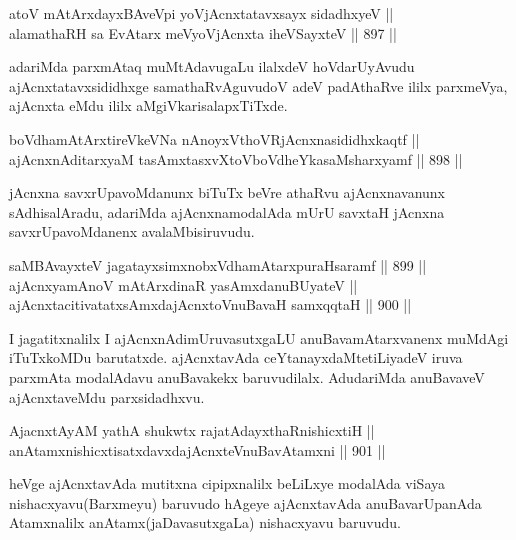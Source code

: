 \begin{shl}
atoV mAtArxdayxBAveV\s pi yoV\s jAcnxtatavxsayx sidadhxyeV || \\
alamathaRH sa EvAtarx meVyoV\s jAcnxta iheVSayxteV \hfill || 897 ||  
\end{shl}

\begin{artha}
adariMda parxmAtaq muMtAdavugaLu ilalxdeV hoVdarU\break yAvudu ajAcnxtatavxsididhxge samathaRvAguvudoV adeV padAthaRve ililx parxmeVya, ajAcnxta eMdu ililx aMgiVkarisalapxTiTxde.
\end{artha}


\begin{shl}
boVdhamAtArxtireVkeVNa nAnoyxV\s thoVR\s jAcnxnasididhxkaqtf || \\
ajAcnxnAditarxyaM tasAmxtasxvXtoVboVdheYkasaMsharxyamf \hfill || 898 ||  
\end{shl}

\begin{artha}
jAcnxna savxrUpavoMdanunx biTuTx beVre athaRvu ajAcnxnavanunx sAdhisalAradu, adariMda ajAcnxnamodalAda mUrU savxtaH jAcnxna savxrUpavoMdanenx avalaMbisiruvudu.
\end{artha}

\begin{shl}
saMBAvayxteV jagatayxsimxnobxVdhamAtarxpuraHsaramf \hfill || 899 || \\
ajAcnxyamAnoV mAtArxdinaR yasAmxdanuBUyateV || \\
ajAcnxtacitivatatxsAmxdajAcnxtoV\s nuBavaH samxqqtaH \hfill || 900 || 
\end{shl}

\begin{artha}
I jagatitxnalilx I ajAcnxnAdimUruvasutxgaLU anuBavamAtarxvanenx muMdAgi iTuTxkoMDu barutatxde. ajAcnxtavAda ceYtanayxdaMte\break tiLiyadeV iruva parxmAta modalAdavu anuBavakekx baruvudilalx. AdudariMda anuBavaveV ajAcnxtaveMdu parxsidadhxvu.
\end{artha}


\begin{shl}
AjacnxtAyAM yathA shukwtx rajatAdayxthaRnishicxtiH || \\
anAtamxnishicxtisatxdavxdajAcnxteV\s nuBavAtamxni \hfill || 901 ||  
\end{shl}

\begin{artha}
heVge ajAcnxtavAda mutitxna cipipxnalilx beLiLxye modalAda viSaya nishacxyavu(Barxmeyu) baruvudo hAgeye ajAcnxtavAda anuBavarUpanAda Atamxnalilx anAtamx(jaDavasutxgaLa) nishacxyavu baruvudu.
\end{artha}

